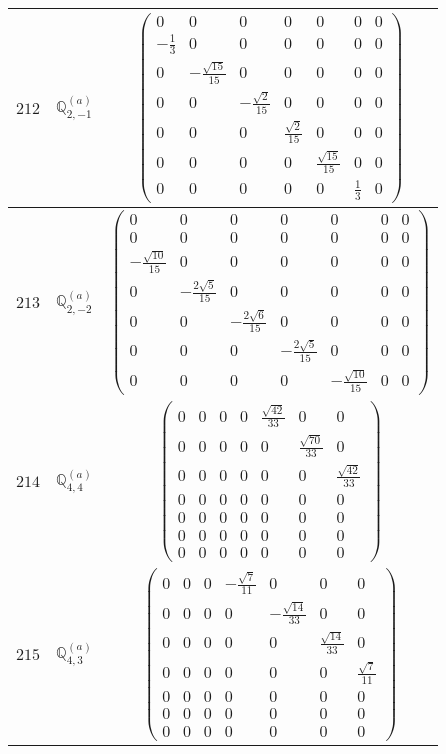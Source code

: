 \documentclass[fleqn,8pt,landscape]{jsarticle}
\begin{document}
\begin{center}
\begin{longtable}{ccc}
$ 212 $ & $ \mathbb{Q}_{2,-1}^{(a)} $ & $ \begin{pmatrix} 0 & 0 & 0 & 0 & 0 & 0 & 0 \\ - \frac{1}{3} & 0 & 0 & 0 & 0 & 0 & 0 \\ 0 & - \frac{\sqrt{15}}{15} & 0 & 0 & 0 & 0 & 0 \\ 0 & 0 & - \frac{\sqrt{2}}{15} & 0 & 0 & 0 & 0 \\ 0 & 0 & 0 & \frac{\sqrt{2}}{15} & 0 & 0 & 0 \\ 0 & 0 & 0 & 0 & \frac{\sqrt{15}}{15} & 0 & 0 \\ 0 & 0 & 0 & 0 & 0 & \frac{1}{3} & 0 \end{pmatrix} $ \\ \hline
$ 213 $ & $ \mathbb{Q}_{2,-2}^{(a)} $ & $ \begin{pmatrix} 0 & 0 & 0 & 0 & 0 & 0 & 0 \\ 0 & 0 & 0 & 0 & 0 & 0 & 0 \\ - \frac{\sqrt{10}}{15} & 0 & 0 & 0 & 0 & 0 & 0 \\ 0 & - \frac{2 \sqrt{5}}{15} & 0 & 0 & 0 & 0 & 0 \\ 0 & 0 & - \frac{2 \sqrt{6}}{15} & 0 & 0 & 0 & 0 \\ 0 & 0 & 0 & - \frac{2 \sqrt{5}}{15} & 0 & 0 & 0 \\ 0 & 0 & 0 & 0 & - \frac{\sqrt{10}}{15} & 0 & 0 \end{pmatrix} $ \\ \hline
$ 214 $ & $ \mathbb{Q}_{4,4}^{(a)} $ & $ \begin{pmatrix} 0 & 0 & 0 & 0 & \frac{\sqrt{42}}{33} & 0 & 0 \\ 0 & 0 & 0 & 0 & 0 & \frac{\sqrt{70}}{33} & 0 \\ 0 & 0 & 0 & 0 & 0 & 0 & \frac{\sqrt{42}}{33} \\ 0 & 0 & 0 & 0 & 0 & 0 & 0 \\ 0 & 0 & 0 & 0 & 0 & 0 & 0 \\ 0 & 0 & 0 & 0 & 0 & 0 & 0 \\ 0 & 0 & 0 & 0 & 0 & 0 & 0 \end{pmatrix} $ \\ \hline
$ 215 $ & $ \mathbb{Q}_{4,3}^{(a)} $ & $ \begin{pmatrix} 0 & 0 & 0 & - \frac{\sqrt{7}}{11} & 0 & 0 & 0 \\ 0 & 0 & 0 & 0 & - \frac{\sqrt{14}}{33} & 0 & 0 \\ 0 & 0 & 0 & 0 & 0 & \frac{\sqrt{14}}{33} & 0 \\ 0 & 0 & 0 & 0 & 0 & 0 & \frac{\sqrt{7}}{11} \\ 0 & 0 & 0 & 0 & 0 & 0 & 0 \\ 0 & 0 & 0 & 0 & 0 & 0 & 0 \\ 0 & 0 & 0 & 0 & 0 & 0 & 0 \end{pmatrix} $ \\ \hline

\end{longtable}
\end{center}
\end{document}
